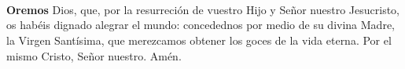 \\[1mm]
\\[1mm]
\\[2mm]
\textbf{Oremos}
 Dios, que, por la resurreción de vuestro Hijo y Señor nuestro Jesucristo,
os habéis dignado alegrar el mundo: concedednos por medio de su divina Madre, la Virgen Santísima,
que merezcamos obtener los goces de la vida eterna. Por el mismo Cristo, Señor nuestro. Amén.
